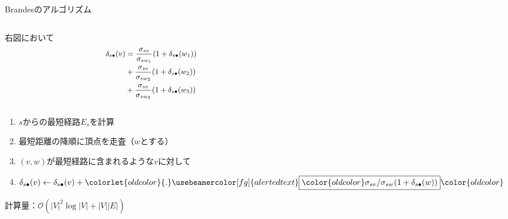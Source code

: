 \documentclass[dvipdfmx,fleqn]{beamer}
\begin{document}
\begin{frame}{Brandesのアルゴリズム}
  \begin{columns}
    \begin{column}{.49\textwidth}
      右図において
      \begin{equation*}\small
        \begin{aligned}
          \delta_{s\bullet}(v)&=\frac{\sigma_{sv}}{\sigma_{sw_1}}(1+\delta_{s\bullet}(w_1)) \\
          &+\frac{\sigma_{sv}}{\sigma_{sw_2}}(1+\delta_{s\bullet}(w_2)) \\
          &+\frac{\sigma_{sv}}{\sigma_{sw_3}}(1+\delta_{s\bullet}(w_3))
        \end{aligned}
      \end{equation*}
    \end{column}
    \begin{column}{.49\textwidth}
      \centering
      \def\svgwidth{.9\columnwidth}
      
    \end{column}
  \end{columns}
  \medskip
  \begin{enumerate}
  \item $s$からの最短経路$E_s$を計算
  \item 最短距離の降順に頂点を走査（$w$とする）
  \item $(v,w)$が最短経路に含まれるような$v$に対して
  \item[] $\delta_{s\bullet}(v)\gets\delta_{s\bullet}(v)+\colorlet{oldcolor}{.}\usebeamercolor[fg]{alerted text}\fbox{$\color{oldcolor}\sigma_{sv}/\sigma_{sw}(1+\delta_{s\bullet}(w))$}\color{oldcolor}$
  \end{enumerate}
  計算量：\alert{$\mathcal{O}(|V|^2\log |V|+|V||E|)$}
\end{frame}
\end{document}
